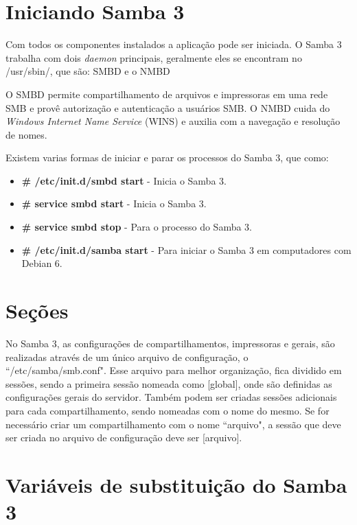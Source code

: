 \section{Iniciando Samba 3}

Com todos os componentes instalados a aplicação pode ser iniciada. O Samba 3 trabalha com dois \textit{daemon} principais, geralmente eles se encontram no /usr/sbin/,  que são: SMBD e o NMBD

O SMBD permite compartilhamento de arquivos e impressoras em uma rede SMB e provê autorização e autenticação a usuários SMB. O NMBD cuida do \textit{Windows Internet Name Service} (WINS) e auxilia com a navegação e resolução de nomes.\cite{SAMBA}

Existem varias formas de iniciar e parar os processos do Samba 3, que como:
\begin{itemize}
	\item \textbf{\# /etc/init.d/smbd start} - Inicia o Samba 3. 
	\item \textbf{\# service smbd start} - Inicia o Samba 3.
	\item \textbf{\# service smbd stop} - Para o processo do Samba 3.
	\item \textbf{\# /etc/init.d/samba start} - Para iniciar o Samba 3 em computadores com Debian 6.
\end{itemize}

\section{Seções}

No Samba 3, as configurações de compartilhamentos, impressoras e gerais, são realizadas através de um único arquivo de configuração, o ``/etc/samba/smb.conf". Esse arquivo para melhor organização, fica dividido em sessões, sendo a primeira sessão nomeada como [global], onde são definidas as configurações gerais do servidor. Também podem ser criadas sessões adicionais para cada compartilhamento, sendo nomeadas com o nome do mesmo. Se for necessário criar um compartilhamento com o nome ``arquivo", a sessão que deve ser criada no arquivo de configuração deve ser [arquivo].

\section{Variáveis de substituição do Samba 3}

